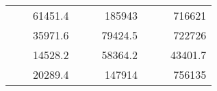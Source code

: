 \begin{table}[]
\begin{tabular}{|ccrccrccc}
\rowcolor[HTML]{DDFDFF} 
\multicolumn{1}{|c|}{\cellcolor[HTML]{FFFFC7}}                                & \multicolumn{1}{c|}{\cellcolor[HTML]{DDFDFF}}                      & \multicolumn{1}{r|}{\cellcolor[HTML]{DAE8FC}61451.4}   & \multicolumn{1}{c|}{\cellcolor[HTML]{FFFFC7}}                                & \multicolumn{1}{c|}{\cellcolor[HTML]{DDFDFF}}                       & \multicolumn{1}{r|}{\cellcolor[HTML]{DDFDFF}185943}    & \multicolumn{1}{c|}{\cellcolor[HTML]{FFFFC7}}                                & \multicolumn{1}{c|}{\cellcolor[HTML]{DDFDFF}}                      & \multicolumn{1}{r|}{\cellcolor[HTML]{DDFDFF}716621}    \\ \cline{3-3} \cline{6-6} \cline{9-9} 
\multicolumn{1}{|c|}{\cellcolor[HTML]{FFFFC7}}                                & \multicolumn{1}{c|}{\cellcolor[HTML]{DDFDFF}}                      & \multicolumn{1}{r|}{\cellcolor[HTML]{DDFDFF}35971.6}   & \multicolumn{1}{c|}{\cellcolor[HTML]{FFFFC7}}                                & \multicolumn{1}{c|}{\cellcolor[HTML]{DDFDFF}}                       & \multicolumn{1}{r|}{\cellcolor[HTML]{DAE8FC}79424.5}   & \multicolumn{1}{c|}{\cellcolor[HTML]{FFFFC7}}                                & \multicolumn{1}{c|}{\cellcolor[HTML]{DDFDFF}}                      & \multicolumn{1}{r|}{\cellcolor[HTML]{DAE8FC}722726}    \\ \cline{3-3} \cline{6-6} \cline{9-9} 
\rowcolor[HTML]{DDFDFF} 
\multicolumn{1}{|c|}{\cellcolor[HTML]{FFFFC7}}                                & \multicolumn{1}{c|}{\cellcolor[HTML]{DDFDFF}}                      & \multicolumn{1}{r|}{\cellcolor[HTML]{DAE8FC}14528.2}   & \multicolumn{1}{c|}{\cellcolor[HTML]{FFFFC7}}                                & \multicolumn{1}{c|}{\cellcolor[HTML]{DDFDFF}}                       & \multicolumn{1}{r|}{\cellcolor[HTML]{DDFDFF}58364.2}   & \multicolumn{1}{c|}{\cellcolor[HTML]{FFFFC7}}                                & \multicolumn{1}{c|}{\cellcolor[HTML]{DDFDFF}}                      & \multicolumn{1}{r|}{\cellcolor[HTML]{DDFDFF}43401.7}   \\ \cline{3-3} \cline{6-6} \cline{9-9} 
\multicolumn{1}{|c|}{\cellcolor[HTML]{FFFFC7}}                                & \multicolumn{1}{c|}{\cellcolor[HTML]{DDFDFF}}                      & \multicolumn{1}{r|}{\cellcolor[HTML]{DDFDFF}20289.4}   & \multicolumn{1}{c|}{\cellcolor[HTML]{FFFFC7}}                                & \multicolumn{1}{c|}{\cellcolor[HTML]{DDFDFF}}                       & \multicolumn{1}{r|}{\cellcolor[HTML]{DAE8FC}147914}    & \multicolumn{1}{c|}{\cellcolor[HTML]{FFFFC7}}                                & \multicolumn{1}{c|}{\cellcolor[HTML]{DDFDFF}}                      & \multicolumn{1}{r|}{\cellcolor[HTML]{DAE8FC}756135}    \\ \cline{3-3} \cline{6-6} \cline{9-9} 

\end{tabular}
\end{table}
